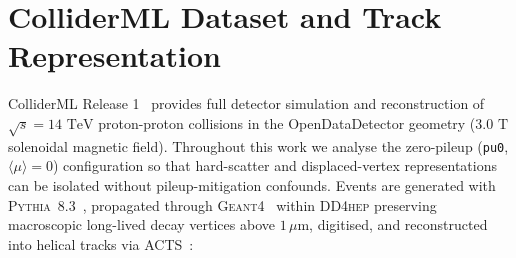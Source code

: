 \documentclass{article}
\begin{document}
\section{ColliderML Dataset and Track Representation}
\label{sec:dataset}

ColliderML Release 1~\cite{ColliderML,ColliderMLDataset} provides full detector simulation and reconstruction of $\sqrt{s} = 14\text{ TeV}$ proton-proton collisions in the OpenDataDetector geometry ($3.0\text{ T}$ solenoidal magnetic field). Throughout this work we analyse the zero-pileup (\texttt{pu0}, $\langle\mu\rangle = 0$) configuration so that hard-scatter and displaced-vertex representations can be isolated without pileup-mitigation confounds. Events are generated with \textsc{Pythia}~8.3~\cite{Pythia83}, propagated through \textsc{Geant4}~\cite{Geant4} within \textsc{DD4hep} preserving macroscopic long-lived decay vertices above $1\,\mu\text{m}$, digitised, and reconstructed into helical tracks via \textsc{ACTS}~\cite{ACTS}:

\begin{center}
\end{center}
\end{document}
